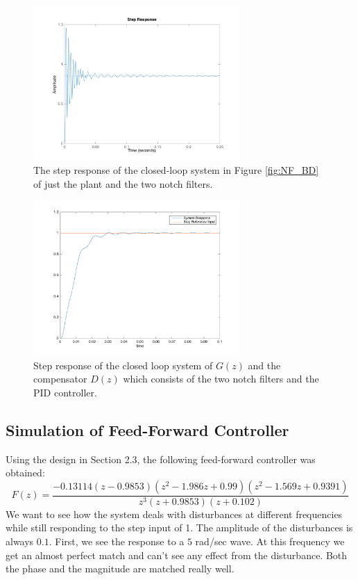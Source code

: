 \documentclass[11pt]{article}
\begin{document}
\begin{figure}[H]
    \centering
    \includegraphics[width=0.7\textwidth]{step_NFandGz.png}
    \caption{The step response of the closed-loop system in Figure \ref{fig:NF_BD} of just the plant and the two notch filters.}
    \label{fig:stepNFgz}
\end{figure}  

\begin{figure}[H]
    \centering
    \includegraphics[width=0.7\textwidth]{dzStep.png}
    \caption{Step response of the closed loop system of $G(z)$ and the compensator $D(z)$ which consists of the two notch filters and the PID controller.}
    \label{fig:dzStep}
\end{figure}

\subsection{Simulation of Feed-Forward Controller}
Using the design in Section 2.3, the following feed-forward controller was obtained:
\[ F(z) = \frac{-0.13114(z-0.9853)(z^{2}-1.986z+0.99)(z^{2}-1.569z+0.9391)}{z^{3}(z+0.9853)(z+0.102)} \]
We want to see how the system deals with disturbances at different frequencies while still responding to the step input of 1. The amplitude of the disturbances is always $0.1$. First, we see the response to a $5$ rad/sec wave. At this frequency we get an almost perfect match and can't see any effect from the disturbance. Both the phase and the magnitude are matched really well.
\end{document}
